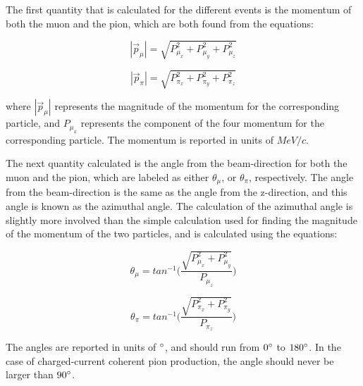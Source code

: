 \documentclass[11pt]{article}
\begin{document}
The first quantity that is calculated for the different events is the momentum of both the muon and the pion, which are both found from the equations:

\begin{equation}
|\vec{p}_\mu| = \sqrt{P_{\mu_x}^2 + P_{\mu_y}^2 + P_{\mu_z}^2}
\end{equation}

\begin{equation}
|\vec{p}_\pi| = \sqrt{P_{\pi_x}^2 + P_{\pi_y}^2 + P_{\pi_z}^2}
\end{equation}

\noindent
where $|\vec{p}_\mu|$ represents the magnitude of the momentum for the corresponding particle, and $P_{\mu_x}$ represents the component of the four momentum for the corresponding particle. The momentum is reported in units of $MeV/c$.

The next quantity calculated is the angle from the beam-direction for both the muon and the pion, which are labeled as either $\theta_\mu$, or $\theta_\pi$, respectively. The angle from the beam-direction is the same as the angle from the z-direction, and this angle is known as the azimuthal angle. The calculation of the azimuthal angle is slightly more involved than the simple calculation used for finding the magnitude of the momentum of the two particles, and is calculated using the equations:

\begin{equation}
\theta_\mu = tan^{-1}\Bigg(\frac{\sqrt{P_{\mu_x}^2 + P_{\mu_y}^2}}{P_{\mu_z}}\Bigg)
\end{equation}

\begin{equation}
\theta_\pi = tan^{-1}\Bigg(\frac{\sqrt{P_{\pi_x}^2 + P_{\pi_y}^2}}{P_{\pi_z}}\Bigg)
\end{equation}

\noindent
The angles are reported in units of $\degree$, and should run from $0\degree$ to $180\degree$. In the case of charged-current coherent pion production, the angle should never be larger than $90\degree$.
\end{document}
